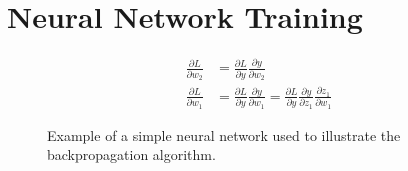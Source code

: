 \section{Neural Network Training}
\label{sec:nn-training}
\begin{figure}[t]
    \vspace{2em}
    \begin{align*}
        \frac{\partial L}{\partial w_2} &=  \frac{\partial L}{\partial y} \frac{\partial y}{\partial w_2} \\
        \frac{\partial L}{\partial w_1} &=  \frac{\partial L}{\partial y} \frac{\partial y}{\partial w_1} = \frac{\partial L}{\partial y} \frac{\partial y}{\partial z_1} \frac{\partial z_1}{\partial w_1}
    \end{align*}
    \caption{Example of a simple neural network used to illustrate the backpropagation algorithm.}
    \label{fig:simple-nn}
\end{figure}

